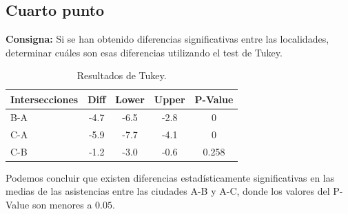 \documentclass{article} %
\begin{document}
\subsection{Cuarto punto}

\textbf{Consigna:} Si se han obtenido diferencias significativas entre las localidades, determinar cuáles son esas diferencias utilizando el test de Tukey.


\begin{table}[H]
	\centering
		\begin{tabular}{||l | c | c | c | c ||}
			\hline
			\hline
			Intersecciones & Diff & Lower & Upper & P-Value\\
			\hline			
			\hline
			B-A & -4.7 & -6.5 & -2.8 & 0\\
			\hline
			C-A & -5.9 & -7.7 & -4.1 & 0\\
			\hline
			C-B & -1.2 & -3.0 & -0.6 & 0.258\\
			\hline
			\hline
		\end{tabular}
		\caption{Resultados de Tukey.}
	\label{tab:table-punto-4-3}
\end{table}

Podemos concluir que existen diferencias estadísticamente significativas en las medias de las asistencias entre las ciudades A-B y A-C, donde los valores del P-Value son menores a $0.05$.
\end{document}
